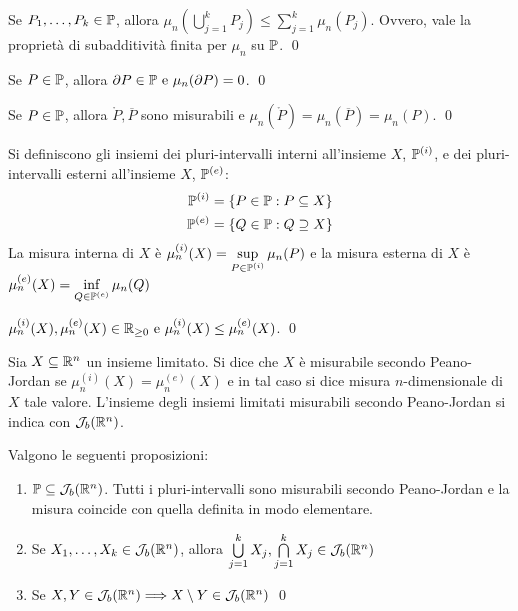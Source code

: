 \begin{corollary}
    Se $P_1,\dots,P_k \in \mathbb{P}$, allora $\mu_n\left(\bigcup\limits_{j=1}^kP_j\right) \leq \sum\limits_{j=1}^k\mu_n(P_j)$. Ovvero, vale la proprietà di subadditività finita per $\mu_n$ su $\mathbb{P}$.
    \qed
\end{corollary}

\begin{lemma}
    Se $P \in \mathbb{P}$, allora $\partial P \in \mathbb{P} \text{ e } \mu_n(\partial P)=0$.
    \qed
\end{lemma}

\begin{corollary}
    Se $P \in \mathbb{P}$, allora $\mathring P, \overline{P}$ sono misurabili e $\mu_n(\mathring P)=\mu_n(\overline{P})=\mu_n(P)$.
    \qed
\end{corollary}

\begin{definition}
    Si definiscono gli insiemi dei pluri-intervalli interni all'insieme $X$, $\mathbb{P}^{(i)}$, e dei pluri-intervalli esterni all'insieme $X$, $\mathbb{P}^{(e)}$:
    \begin{align*}
        \mathbb{P}^{(i)}&=\{P\in \mathbb{P}:P\subseteq X\}\\
        \mathbb{P}^{(e)}&=\{Q \in \mathbb{P}: Q \supseteq X \}
    \end{align*}
    La misura interna di $X$ è $
        \mu_n^{(i)}(X)=\sup\limits_{P\in \mathbb{P}^{(i)}}\mu_n(P)
    $
    e la misura esterna di $X$ è $
        \mu_n^{(e)}(X)=\inf\limits_{Q \in \mathbb{P}^{(e)}}\mu_n(Q)
    $
\end{definition}

\begin{lemma}
    $\mu_n^{(i)}(X), \mu_n^{(e)}(X) \in \mathbb{R}_{\geq 0} \text{ e } \mu_n^{(i)}(X)\leq\mu_n^{(e)}(X)$.
    \qed
\end{lemma}

\begin{definition}
    Sia $X \subseteq \mathbb{R}^n$ un insieme limitato. Si dice che $X$ è misurabile secondo Peano-Jordan se $\mu_n^{(i)}(X)=\mu_n^{(e)}(X)$ e in tal caso si dice misura $n$-dimensionale di $X$ tale valore.
    L'insieme degli insiemi limitati misurabili secondo Peano-Jordan si indica con $\mathcal{J}_b(\mathbb{R}^n)$.
\end{definition}

\begin{lemma} Valgono le seguenti proposizioni:
    \begin{enumerate}
        \item $\mathbb{P} \subseteq \mathcal{J}_b(\mathbb{R}^n)$. Tutti i pluri-intervalli sono misurabili secondo Peano-Jordan e la misura coincide con quella definita in modo elementare.
        \item Se $X_1,\dots,X_k \in \mathcal{J}_b(\mathbb{R}^n)$, allora $\bigcup\limits_{j=1}^k X_j, \bigcap\limits_{j=1}^kX_j \in \mathcal{J}_b(\mathbb{R}^n)$
        \item Se $X,Y \in \mathcal{J}_b(\mathbb{R}^n)\Longrightarrow X \setminus Y \in \mathcal{J}_b(\mathbb{R}^n)$
        \qed
    \end{enumerate}
\end{lemma}


